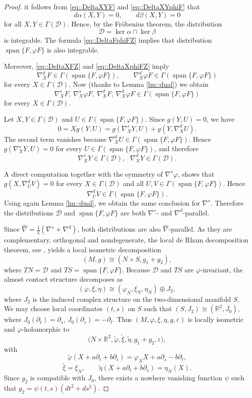 \documentclass[12pt,a4paper,final]{amsart}
\numberwithin{equation}{section}
\theoremstyle{df}
\newcommand{\R}{\mathbb{R}}
\newcommand{\Span}{\operatorname{span}}
\newcommand{\eps}{\varepsilon}
\begin{document}
\begin{proof}
it follows from \eqref{eq::DeltaXYF} and \eqref{eq::DeltaXYphiF} that
$$
d\alpha(X,Y)=0,\qquad d\beta(X,Y)=0
$$
for all $X,Y\in\Gamma(\mathcal D)$.
Hence, by the Fr\"obenius theorem, the distribution
$$
\mathcal D=\ker\alpha\cap\ker\beta
$$
is integrable. The formula \eqref{eq::DeltaFphiFZ} implies that
distribution $\Span\{F,\varphi F\}$ is also integrable.
\par Moreover, \eqref{eq::DeltaXFZ} and \eqref{eq::DeltaXphiFZ} imply
$$
\nabla^d_XF\in\Gamma(\Span\{F,\varphi F\}),\qquad \nabla^d_X\varphi F\in\Gamma(\Span\{F,\varphi F\})
$$
for every $X\in\Gamma(\mathcal D)$.
Now (thanks to Lemma \ref{lm::dual}) we obtain
$$
\nabla^s_XF,\ \nabla^s_X\varphi F,\ \nabla^d_XF,\ \nabla^d_X\varphi F
\in \Gamma(\Span\{F,\varphi F\})
$$
for every $X\in\Gamma(\mathcal D)$.
\par Let $X,Y\in\Gamma(\mathcal D)$ and $U\in\Gamma(\Span\{F,\varphi F\})$.
Since $g(Y,U)=0$, we have
$$
0=Xg(Y,U)=g(\nabla^s_XY,U)+g(Y,\nabla^d_XU).
$$
The second term vanishes because $\nabla^d_XU\in\Gamma(\Span\{F,\varphi F\})$.
Hence $g(\nabla^s_XY,U)=0$ for every $U\in\Gamma(\Span\{F,\varphi F\})$, and therefore
$$
\nabla^s_XY\in\Gamma(\mathcal D), \ \ \ \nabla^d_XY\in\Gamma(\mathcal D).
$$

A direct computation together with the symmetry of
$\nabla^s\varphi$, shows that
$
g(X,\nabla^d_UV)=0
$
for every $X\in\Gamma(\mathcal D)$ and all
$U,V\in\Gamma(\Span\{F,\varphi F\})$.
Hence
$$
\nabla^d_UV\in\Gamma(\Span\{F,\varphi F\}).
$$
Using again Lemma \ref{lm::dual}, we obtain the same conclusion for $\nabla^s$.
Therefore the distributions
$\mathcal D$ and $\Span\{F,\varphi F\}$
are both $\nabla^s$- and $\nabla^d$-parallel.
\par Since $\widehat{\nabla}=\frac{1}{2}(\nabla^s+\nabla^d)$,
both distributions are also $\widehat{\nabla}$-parallel. As they are
complementary, orthogonal and nondegenerate, the local de Rham decomposition
theorem, see \cite{M}, yields a local isometric decomposition
$$
(M,g)\cong (N\times S,g_1+g_2),
$$
where $TN=\mathcal D$ and $TS=\Span\{F,\varphi F\}$.
Because $\mathcal D$ and $TS$ are $\varphi$-invariant, the almost contact
structure decomposes as
$$
(\varphi,\xi,\eta)\cong (\varphi_N,\xi_N,\eta_N)\oplus J_2,
$$
where $J_2$ is the induced complex structure on the two-dimensional manifold $S$.
We may choose local coordinates $(t,s)$ on $S$ such that $(S,J_2)\cong (\R^2,J_0)$, where
$J_0(\partial_t)=\partial_s$, $J_0(\partial_s)=-\partial_t$.
Thus $(M,\varphi,\xi,\eta,g,\eps)$ is locally isometric and $\varphi$-holomorphic
to
$$
\bigl(N\times \R^2,\widetilde\varphi,\widetilde\xi,\widetilde\eta,g_1+g_2,\eps\bigr),
$$
with
$$
\widetilde\varphi(X+a\partial_t+b\partial_s)=\varphi_NX+a\partial_s-b\partial_t,
$$
$$
\widetilde\xi=\xi_N,\qquad \widetilde\eta(X+a\partial_t+b\partial_s)=\eta_N(X).
$$
Since $g_2$ is compatible with $J_0$, there exists a nowhere vanishing function
$\psi$ such that $g_2=\psi(t,s)(dt^2+ds^2)$.


\end{proof}
\end{document}
